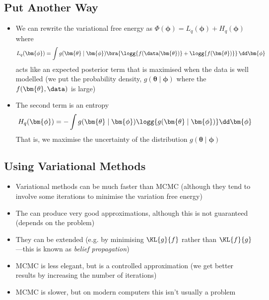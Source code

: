 \begin{slide}
\section[-2]{Put Another Way}

\begin{PauseHighLight}
  \begin{itemize}
  \item We can rewrite the variational free energy as $\Phi(\bm{\phi})
    = L_q(\bm{\phi}) + H_q(\bm{\phi})$ where
    \begin{align*}
      L_q(\bm{\phi}) = \int g(\bm{\theta}\mid\bm{\phi}) \bra{
      \logg{\strut f(\data| \bm{\theta})} + \logg{f(\bm{\theta})} } \, \dd \bm{\phi}
    \end{align*}
    acts like an expected posterior term that is maximised when the
    data is well modelled (we put the probability density,
    $g(\bm{\theta}\mid\bm{\phi})$ where the $f(\bm{\theta}, \data)$ is
    large)\pause
  \item The second term is an entropy
    \begin{align*}
      H_q(\bm{\phi}) = - \int g(\bm{\theta}\mid\bm{\phi})
      \logg{\strut g(\bm{\theta}\mid\bm{\phi})} \dd \bm{\phi}
    \end{align*}
    That is, we maximise the uncertainty of the distribution $g(\bm{\theta}\mid\bm{\phi})$\pause
  \end{itemize}
\end{PauseHighLight}

\end{slide}



\begin{slide}
\section[-2]{Using Variational Methods}

\begin{PauseHighLight}
  \begin{itemize}
  \item Variational methods can be much faster than MCMC (although
    they tend to involve some iterations to minimise the variation
    free energy)\pause
  \item The can produce very good approximations, although this is not
    guaranteed (depends on the problem)\pause
  \item They can be extended (e.g. by minimising $\KL{g}{f}$
    rather than $\KL{f}{g}$---this is known as\textit{ belief
      propagation})\pause
  \item MCMC is less elegant, but is a controlled approximation (we get
    better results by increasing the number of iterations)\pause
  \item MCMC is slower, but on modern computers this isn't usually a
    problem\pause
  \end{itemize}
\end{PauseHighLight}

\end{slide}




